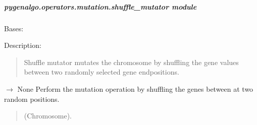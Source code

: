 \documentclass[letterpaper,10pt,english]{sphinxmanual}
\begin{document}
\subparagraph{pygenalgo.operators.mutation.shuffle\_mutator module}
\label{\detokenize{pygenalgo.operators.mutation:module-pygenalgo.operators.mutation.shuffle_mutator}}\label{\detokenize{pygenalgo.operators.mutation:pygenalgo-operators-mutation-shuffle-mutator-module}}

\begin{fulllineitems}
\label{\detokenize{pygenalgo.operators.mutation:pygenalgo.operators.mutation.shuffle_mutator.ShuffleMutator}}
\pysigstartsignatures
\pysiglinewithargsret
{}
{}
{}
\pysigstopsignatures
\sphinxAtStartPar
Bases: {\hyperref[\detokenize{pygenalgo.operators.mutation:pygenalgo.operators.mutation.mutate_operator.MutationOperator}]{}}

\sphinxAtStartPar
Description:
\begin{quote}

\sphinxAtStartPar
Shuffle mutator mutates the chromosome by shuffling the gene
values between two randomly selected gene end\sphinxhyphen{}positions.
\end{quote}

\begin{fulllineitems}
\label{\detokenize{pygenalgo.operators.mutation:pygenalgo.operators.mutation.shuffle_mutator.ShuffleMutator.mutate}}
\pysigstartsignatures
\pysiglinewithargsret
{}
{}
{{ $\rightarrow$ None}}
\pysigstopsignatures
\sphinxAtStartPar
Perform the mutation operation by shuffling the genes
between at two random positions.
\begin{quote}\begin{description}
\sphinxAtStartPar
{} \textendash{} (Chromosome).


\end{description}
\end{quote}
\end{fulllineitems}
\end{fulllineitems}
\end{document}
